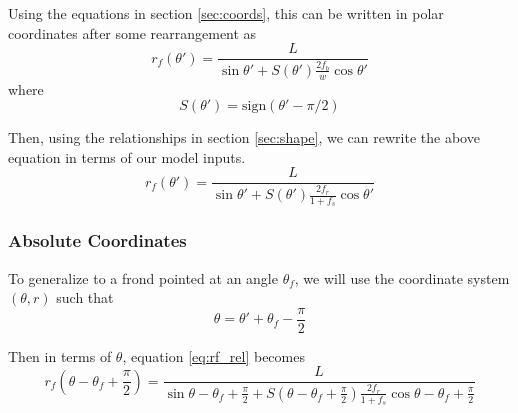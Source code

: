 \documentclass{article}
\newcommand{\sign}{\mbox{sign}}
\begin{document}
\begin{multicols}{2}
Using the equations in section \ref{sec:coords}, this can be written in polar coordinates after some rearrangement as
\begin{equation}
	r_f(\theta') = \frac{L}{\sin\theta' + S(\theta')\frac{2f_b}{w}\cos\theta'}
\end{equation}
where
\begin{equation}
	S(\theta') = \sign(\theta'-\pi/2)
\end{equation}

Then, using the relationships in section \ref{sec:shape}, we can rewrite the above equation in terms of our model inputs.
\begin{equation}
	\label{eq:rf_rel}
	r_f(\theta') = \frac{L}{\sin\theta' + S(\theta')\frac{2f_r}{1+f_s}\cos\theta'}
\end{equation}

\subsubsection{Absolute Coordinates}
To generalize to a frond pointed at an angle $\theta_f$, we will use the coordinate system $(\theta,r)$ such that
\begin{equation}
	\theta = \theta' + \theta_f - \frac{\pi}{2}
\end{equation}

Then in terms of $\theta$, equation \ref{eq:rf_rel} becomes
\begin{equation}
	\label{eq:rf_abs}
	r_f(\theta - \theta_f + \frac{\pi}{2}) = \frac{L}{\sin\theta - \theta_f + \frac{\pi}{2} + S(\theta - \theta_f + \frac{\pi}{2})\frac{2f_r}{1+f_s}\cos\theta - \theta_f + \frac{\pi}{2}}
\end{equation}


\end{multicols}
\end{document}
